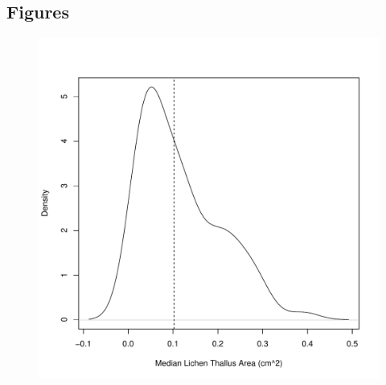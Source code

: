 \documentclass[11pt,twocolumn,twoside,lineno]{pnas-new}
\begin{document}
\newpage


\newpage


\newpage


\newpage
\subsection*{Figures}

\begin{figure}[ht]
\centering
\includegraphics[width=\linewidth]{xg_size.pdf}
\caption{}
\label{fig:xg_size_app}
\end{figure}
\end{document}
